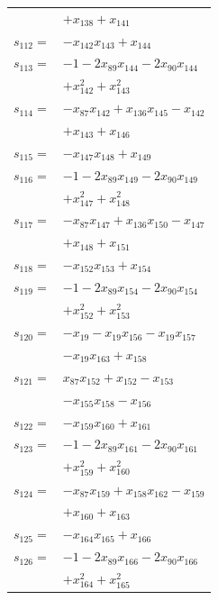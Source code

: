 \begin{longtable}{@{}r@{\;}l@{}}
 & \(\displaystyle +x_{138} +x_{141}\) \\[3pt]
\(s_{112}=\) & \(\displaystyle -x_{142}x_{143} +x_{144}\) \\[3pt]
\(s_{113}=\) & \(\displaystyle -1 -2x_{89}x_{144} -2x_{90}x_{144}\) \\
 & \(\displaystyle +x_{142}^{2} +x_{143}^{2}\) \\[3pt]
\(s_{114}=\) & \(\displaystyle -x_{87}x_{142} +x_{136}x_{145} -x_{142}\) \\
 & \(\displaystyle +x_{143} +x_{146}\) \\[3pt]
\(s_{115}=\) & \(\displaystyle -x_{147}x_{148} +x_{149}\) \\[3pt]
\(s_{116}=\) & \(\displaystyle -1 -2x_{89}x_{149} -2x_{90}x_{149}\) \\
 & \(\displaystyle +x_{147}^{2} +x_{148}^{2}\) \\[3pt]
\(s_{117}=\) & \(\displaystyle -x_{87}x_{147} +x_{136}x_{150} -x_{147}\) \\
 & \(\displaystyle +x_{148} +x_{151}\) \\[3pt]
\(s_{118}=\) & \(\displaystyle -x_{152}x_{153} +x_{154}\) \\[3pt]
\(s_{119}=\) & \(\displaystyle -1 -2x_{89}x_{154} -2x_{90}x_{154}\) \\
 & \(\displaystyle +x_{152}^{2} +x_{153}^{2}\) \\[3pt]
\(s_{120}=\) & \(\displaystyle -x_{19} -x_{19}x_{156} -x_{19}x_{157}\) \\
 & \(\displaystyle -x_{19}x_{163} +x_{158}\) \\[3pt]
\(s_{121}=\) & \(\displaystyle x_{87}x_{152} +x_{152} -x_{153}\) \\
 & \(\displaystyle -x_{155}x_{158} -x_{156}\) \\[3pt]
\(s_{122}=\) & \(\displaystyle -x_{159}x_{160} +x_{161}\) \\[3pt]
\(s_{123}=\) & \(\displaystyle -1 -2x_{89}x_{161} -2x_{90}x_{161}\) \\
 & \(\displaystyle +x_{159}^{2} +x_{160}^{2}\) \\[3pt]
\(s_{124}=\) & \(\displaystyle -x_{87}x_{159} +x_{158}x_{162} -x_{159}\) \\
 & \(\displaystyle +x_{160} +x_{163}\) \\[3pt]
\(s_{125}=\) & \(\displaystyle -x_{164}x_{165} +x_{166}\) \\[3pt]
\(s_{126}=\) & \(\displaystyle -1 -2x_{89}x_{166} -2x_{90}x_{166}\) \\
 & \(\displaystyle +x_{164}^{2} +x_{165}^{2}\) \\[3pt]

\end{longtable}
